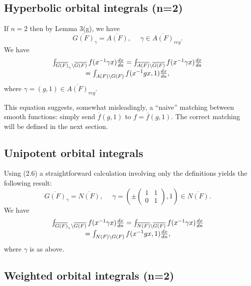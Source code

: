 \subsection{Hyperbolic orbital integrals (n=2)}

If $n=2$ then by Lemma 3(g), we have
\[
\overline{G(F)}_\gamma
=\overline{A(F)},\ \ \ \ \ \
\gamma\in \overline{A(F)}_{reg}.
\]
We have
\begin{equation}
\begin{array}{c}
\int_{\overline{G(F)}_\gamma\backslash \overline{G(F)}}
f(x^{-1}\gamma x){dx\over da}
=\int_{\overline{A(F)}\backslash \overline{G(F)}}
f(x^{-1}\gamma x){dx\over da}\\
=\int_{A(F)\backslash G(F)}
f(x^{-1}gx,1){dx\over da},
\end{array}
\end{equation}
where $\gamma =(g,1)\in \overline{A(F)}_{reg}$.

This equation suggests, somewhat misleadingly, a ``naive'' matching between
smooth functions: simply send $\overline{f}(g,1)$ to
$f=\overline{f}(g,1)$. The correct matching will be defined in the
next section.

\subsection{Unipotent orbital integrals}

Using (2.6) a straightforward calculation involving only the definitions
yields the following result:
\[
\overline{G(F)}_\gamma
=\overline{N(F)},\ \ \ \ \ \
\gamma=
(
\pm \left(
\begin{array}{cc}
1 & 1\\
0 & 1
\end{array}
\right)
,1)\in \overline{N(F)}.
\]
We have
\begin{equation}
\begin{array}{c}
\int_{\overline{G(F)}_\gamma\backslash \overline{G(F)}}
f(x^{-1}\gamma x){dx\over dn}
=\int_{\overline{N(F)}\backslash \overline{G(F)}}
f(x^{-1}\gamma x){dx\over dn}\\
=\int_{N(F)\backslash G(F)}
f(x^{-1}gx,1){dx\over dn},
\end{array}
\end{equation}
where $\gamma $ is as above.

\subsection{Weighted orbital integrals (n=2)}

